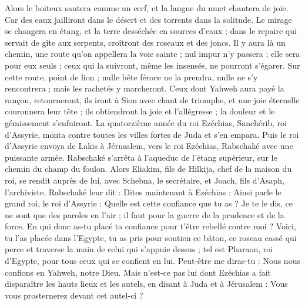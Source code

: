 \begin{multicols}{2}
Alors le boiteux sautera comme un cerf, et la langue du muet chantera de joie. Car des eaux jailliront dans le désert et des torrents dans la solitude.
Le mirage se changera en étang, et la terre desséchée en sources d'eaux ; dans le repaire qui servait de gîte aux serpents, croîtront des roseaux et des joncs.
Il y aura là un chemin, une route qu'on appellera la voie sainte ; nul impur n'y passera ; elle sera pour eux seuls ; ceux qui la suivront, même les insensés, ne pourront s'égarer.
Sur cette route, point de lion ; nulle bête féroce ne la prendra, nulle ne s'y rencontrera ; mais les rachetés y marcheront.
Ceux dont Yahweh aura payé la rançon, retourneront, ils iront à Sion avec chant de triomphe, et une joie éternelle couronnera leur tête ; ils obtiendront la joie et l'allégresse ; la douleur et le gémissement s'enfuiront.
\VerseOne{}La quatorzième année du roi Ezéchias, Sanchérib, roi d'Assyrie, monta contre toutes les villes fortes de Juda et s'en empara.
Puis le roi d'Assyrie envoya de Lakis à Jérusalem, vers le roi Ezéchias, Rabschaké avec une puissante armée. Rabschaké s'arrêta à l'aqueduc de l'étang supérieur, sur le chemin du champ du foulon.
Alors Eliakim, fils de Hilkija, chef de la maison du roi, se rendit auprès de lui, avec Schebna, le secrétaire, et Joach, fils d'Asaph, l'archiviste.
Rabschaké leur dit : Dites maintenant à Ezéchias : Ainsi parle le grand roi, le roi d'Assyrie : Quelle est cette confiance que tu as ?
Je te le dis, ce ne sont que des paroles en l'air ; il faut pour la guerre de la prudence et de la force. En qui donc as-tu placé ta confiance pour t'être rebellé contre moi ?
Voici, tu l'as placée dans l'Egypte, tu as pris pour soutien ce bâton, ce roseau cassé qui perce et traverse la main de celui qui s'appuie dessus ; tel est Pharaon, roi d'Egypte, pour tous ceux qui se confient en lui.
Peut-être me diras-tu : Nous nous confions en Yahweh, notre Dieu. Mais n'est-ce pas lui dont Ezéchias a fait disparaître les hauts lieux et les autels, en disant à Juda et à Jérusalem : Vous vous prosternerez devant cet autel-ci ?

\end{multicols}
